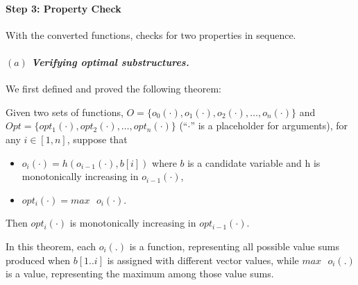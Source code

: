 


\paragraph{Step 3: Property Check}
With the converted functions, \tool checks for two properties in sequence. 

\paragraph{$(a)$ \emph{Verifying optimal substructures.}}
We first defined and proved the following theorem:

\begin{theorem}
\label{thm1}
Given two sets of functions, $O=\{o_0(\cdot), o_1(\cdot), o_2(\cdot),  \ldots, o_n(\cdot)\}$ and  $Opt=\{opt_1(\cdot), opt_2(\cdot), \ldots, opt_n(\cdot)\}$ (``$\cdot$'' is a placeholder for arguments), for any $i\in[1, n]$, suppose that
\begin{itemize}
    \item $o_i(\cdot)=h(o_{i-1}(\cdot), b[i])$ where $b$ is a candidate variable and h is monotonically increasing in $o_{i-1}(\cdot)$,  
    \item $opt_i(\cdot)=max\text{ }o_i(\cdot)$. 
\end{itemize}
Then $opt_i(\cdot)$ is monotonically increasing in $opt_{i-1}(\cdot)$. 
\end{theorem}

In this theorem, each $o_i(.)$ is a function, representing all possible value sums produced when $b[1..i]$ is assigned with different vector values, while $max\text{ }o_i(.)$ is a value, representing the maximum among those value sums.

